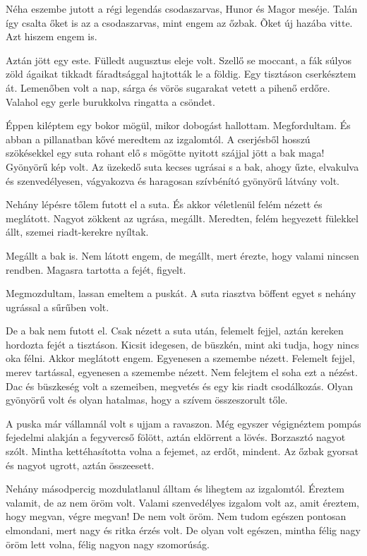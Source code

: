 \documentclass{IEEEtran}
\begin{document}
Néha eszembe jutott a régi legendás csodaszarvas, Hunor és Magor meséje. Talán így csalta őket is az a csodaszarvas, mint engem az őzbak. Õket új hazába vitte. Azt hiszem engem is.

Aztán jött egy este. Fülledt augusztus eleje volt. Szellő se moccant, a fák súlyos zöld ágaikat tikkadt fáradtsággal hajtották le a földig. Egy tisztáson cserkésztem át. Lemenőben volt a nap, sárga és vörös sugarakat vetett a pihenő erdőre. Valahol egy gerle burukkolva ringatta a csöndet.

Éppen kiléptem egy bokor mögül, mikor dobogást hallottam. Megfordultam. És abban a pillanatban kővé meredtem az izgalomtól. A cserjésből hosszú szökésekkel egy suta rohant elő s mögötte nyitott szájjal jött a bak maga! Gyönyörű kép volt. Az üzekedő suta kecses ugrásai s a bak, ahogy űzte, elvakulva és szenvedélyesen, vágyakozva és haragosan szívbénító gyönyörű látvány volt.

Nehány lépésre tőlem futott el a suta. És akkor véletlenül felém nézett és meglátott. Nagyot zökkent az ugrása, megállt. Meredten, felém hegyezett fülekkel állt, szemei riadt-kerekre nyíltak.

Megállt a bak is. Nem látott engem, de megállt, mert érezte, hogy valami nincsen rendben. Magasra tartotta a fejét, figyelt.

Megmozdultam, lassan emeltem a puskát. A suta riasztva böffent egyet s nehány ugrással a sűrűben volt.

De a bak nem futott el. Csak nézett a suta után, felemelt fejjel, aztán kereken hordozta fejét a tisztáson. Kicsit idegesen, de büszkén, mint aki tudja, hogy nincs oka félni. Akkor meglátott engem. Egyenesen a szemembe nézett. Felemelt fejjel, merev tartással, egyenesen a szemembe nézett. Nem felejtem el soha ezt a nézést. Dac és büszkeség volt a szemeiben, megvetés és egy kis riadt csodálkozás. Olyan gyönyörű volt és olyan hatalmas, hogy a szívem összeszorult tőle.

A puska már vállamnál volt s ujjam a ravaszon. Még egyszer végignéztem pompás fejedelmi alakján a fegyvercső fölött, aztán eldörrent a lövés. Borzasztó nagyot szólt. Mintha kettéhasította volna a fejemet, az erdőt, mindent. Az őzbak gyorsat és nagyot ugrott, aztán összeesett.

Nehány másodpercig mozdulatlanul álltam és lihegtem az izgalomtól. Éreztem valamit, de az nem öröm volt. Valami szenvedélyes izgalom volt az, amit éreztem, hogy megvan, végre megvan! De nem volt öröm. Nem tudom egészen pontosan elmondani, mert nagy és ritka érzés volt. De olyan volt egészen, mintha félig nagy öröm lett volna, félig nagyon nagy szomorúság.
\end{document}
